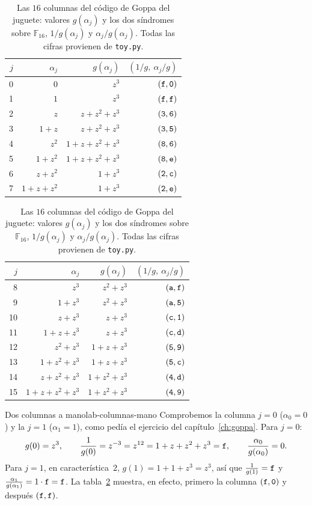 \documentclass[11pt,a4paper,oneside]{report}
\newcommand{\GF}[1]{\mathbb{F}_{#1}}
\newcommand{\hx}[1]{\text{\texttt{#1}}}
\begin{document}
\begin{table}[htbp]
\centering
\footnotesize
\setlength{\tabcolsep}{4.5pt}
\begin{minipage}[t]{0.49\textwidth}\centering
\begin{tabular}{rrrr}
\toprule
$j$ & $\alpha_j$ & $g(\alpha_j)$ & $(1/g,\ \alpha_j/g)$\\
\midrule
0 & $0$ & $z^3$ & $(\hx f,\hx 0)$\\
1 & $1$ & $z^3$ & $(\hx f,\hx f)$\\
2 & $z$ & $z+z^2+z^3$ & $(\hx 3,\hx 6)$\\
3 & $1+z$ & $z+z^2+z^3$ & $(\hx 3,\hx 5)$\\
4 & $z^2$ & $1+z+z^2+z^3$ & $(\hx 8,\hx 6)$\\
5 & $1+z^2$ & $1+z+z^2+z^3$ & $(\hx 8,\hx e)$\\
6 & $z+z^2$ & $1+z^3$ & $(\hx 2,\hx c)$\\
7 & $1+z+z^2$ & $1+z^3$ & $(\hx 2,\hx e)$\\
\bottomrule
\end{tabular}
\end{minipage}\hfill
\begin{minipage}[t]{0.49\textwidth}\centering
\begin{tabular}{rrrr}
\toprule
$j$ & $\alpha_j$ & $g(\alpha_j)$ & $(1/g,\ \alpha_j/g)$\\
\midrule
8 & $z^3$ & $z^2+z^3$ & $(\hx a,\hx f)$\\
9 & $1+z^3$ & $z^2+z^3$ & $(\hx a,\hx 5)$\\
10 & $z+z^3$ & $z+z^3$ & $(\hx c,\hx 1)$\\
11 & $1+z+z^3$ & $z+z^3$ & $(\hx c,\hx d)$\\
12 & $z^2+z^3$ & $1+z+z^3$ & $(\hx 5,\hx 9)$\\
13 & $1+z^2+z^3$ & $1+z+z^3$ & $(\hx 5,\hx c)$\\
14 & $z+z^2+z^3$ & $1+z^2+z^3$ & $(\hx 4,\hx d)$\\
15 & $1+z+z^2+z^3$ & $1+z^2+z^3$ & $(\hx 4,\hx 9)$\\
\bottomrule
\end{tabular}
\end{minipage}
\caption{Las $16$ columnas del código de Goppa del juguete: valores
$g(\alpha_j)$ y los dos síndromes sobre $\GF{16}$,
$1/g(\alpha_j)$ y $\alpha_j/g(\alpha_j)$. Todas las cifras provienen de
\texttt{toy.py}.}
\label{tab:lab-columnas}
\end{table}

\begin{ejemplo}{Dos columnas a mano}{lab-columnas-mano}
Comprobemos la columna $j=0$ ($\alpha_0=0$) y la $j=1$ ($\alpha_1=1$),
como pedía el ejercicio del capítulo~\ref{ch:goppa}. Para $j=0$:
\[
g(0)=z^3,\qquad
\frac{1}{g(0)}=z^{-3}=z^{12}=1+z+z^2+z^3=\hx{f},\qquad
\frac{\alpha_0}{g(\alpha_0)}=0 .
\]
Para $j=1$, en característica~$2$, $g(1)=1+1+z^3=z^3$, así que
$\frac{1}{g(1)}=\hx f$ y $\frac{\alpha_1}{g(\alpha_1)}=1\cdot\hx f=\hx f$.
La tabla~\ref{tab:lab-columnas} muestra, en efecto, primero la columna
$(\hx f,\hx 0)$ y después $(\hx f,\hx f)$.
\end{ejemplo}
\end{document}
